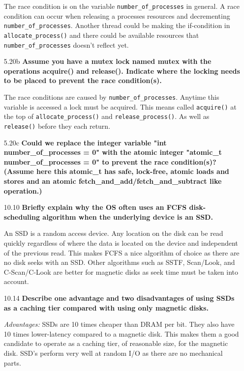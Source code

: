\documentclass[11pt, letterpaper]{hw}
\begin{document}
\begin{enumerate}
The race condition is on the variable {\tt number\_of\_processes} in general. A race condition can occur when releasing a processes resources and decrementing {\tt number\_of\_processes}. Another thread could be making the if-condition in {\tt allocate\_process()} and there could be available resources that {\tt number\_of\_processes} doesn't reflect yet.
 
\item [5.20b] \textbf{Assume you have a mutex lock named mutex with the operations acquire() and release(). Indicate where the locking needs to be placed to prevent the race condition(s).}

The race conditions are caused by {\tt number\_of\_processes}. Anytime this variable is accessed a lock must be acquired. This means called {\tt acquire()} at the top of {\tt allocate\_process()} and {\tt release\_process()}. As well as {\tt release()} before they each return.

\item [5.20c] \textbf{Could we replace the integer variable "int number\_of\_processes = 0" with the atomic integer "atomic\_t number\_of\_processes = 0" to prevent the race condition(s)? (Assume here this atomic\_t has safe, lock-free, atomic loads and stores and an atomic fetch\_and\_add/fetch\_and\_subtract like operation.)}



\item [10.10] \textbf{Briefly explain why the OS often uses an FCFS disk-scheduling algorithm when the underlying device is an SSD.}

An SSD is a random access device. Any location on the disk can be read quickly regardless of where the data is located on the device and independent of the previous read. This makes FCFS a nice algorithm of choice as there are no disk seeks with an SSD. Other algorithms such as SSTF, Scan/Look, and C-Scan/C-Look are better for magnetic disks as seek time must be taken into account.

\item [10.14] \textbf{Describe one advantage and two disadvantages of using SSDs as a caching tier compared with using only magnetic disks.}

{\it Advantages:} SSDs are 10 times cheaper than DRAM per bit. They also have 10 times lower-latency compared to a magnetic disk. This makes them a good candidate to operate as a caching tier, of reasonable size, for the magnetic disk. SSD's perform very well at random I/O as there are no mechanical parts.


\end{enumerate}
\end{document}
